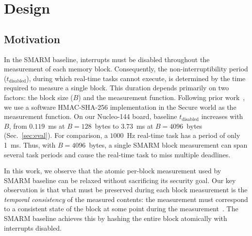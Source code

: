 \documentclass[conference]{IEEEtran}
\newcommand{\tdis}{$t_{\mathrm{disabled}}$\xspace}
\begin{document}
\section{Design}
\label{sec:design}

\subsection{Motivation}
\label{sec:motivation}

In the SMARM baseline, interrupts must be disabled throughout the measurement of each memory block. Consequently, the non-interruptibility period (\tdis), during which real-time tasks cannot execute, is determined by the time required to measure a single block. This duration depends primarily on two factors: the block size ($B$) and the measurement function.
%
Following prior work~\cite{smarmplus2026,carpent2018smarm}, we use a software HMAC-SHA-256 implementation in the Secure world as the measurement function. On our Nucleo-144 board, baseline \tdis{} increases with $B$,
from $0.119$~ms at $B{=}128$~bytes to $3.73$~ms at $B{=}4096$~bytes
(Sec.~\ref{sec:eval}). For comparison, a $1000$~Hz real-time task has a period of only 1~ms. Thus, with $B{=}4096$~bytes, a single SMARM block measurement can span several task periods and cause the real-time task to miss multiple deadlines.

In this work, we observe that the atomic per-block measurement used by
SMARM baseline can be relaxed without sacrificing its security goal.
Our key observation is that what must be preserved during each block
measurement is the \emph{temporal consistency} of the measured contents:
the measurement must correspond to a consistent state of the block at
some point during the measurement~\cite{carpent2018temporal}.
The SMARM baseline achieves this by hashing the entire block atomically with
interrupts disabled.
\end{document}
